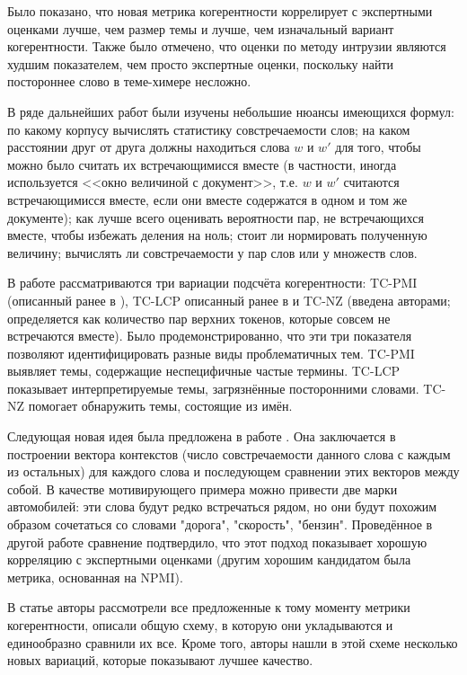 Было показано, что новая метрика когерентности коррелирует с экспертными оценками лучше, чем размер темы и лучше, чем изначальный вариант когерентности. Также было отмечено, что оценки по методу интрузии являются худшим показателем, чем просто экспертные оценки, поскольку найти постороннее слово в теме-химере несложно.

В ряде дальнейших работ были изучены небольшие нюансы имеющихся формул: по какому корпусу вычислять статистику совстречаемости слов; на каком расстоянии друг от друга должны находиться слова $w$ и $w'$ для того, чтобы можно было считать их встречающимисся вместе (в частности, иногда используется <<окно величиной с документ>>, т.е. $w$ и $w'$ считаются встречающимисся вместе, если они вместе содержатся в одном и том же документе); как лучше всего оценивать вероятности пар, не встречающихся вместе, чтобы избежать деления на ноль; стоит ли нормировать полученную величину; вычислять ли совстречаемости у пар слов или у множеств слов.

В работе \cite{boydcare} рассматриваются три вариации подсчёта когерентности: TC-PMI (описанный ранее в \cite{newman2010automatic}), TC-LCP описанный ранее в \cite{mimno} и TC-NZ (введена авторами; определяется как количество пар верхних токенов, которые совсем не встречаются вместе). Было продемонстрированно, что эти три показателя позволяют идентифицировать разные виды проблематичных тем. TC-PMI выявляет темы, содержащие неспецифичные частые термины. TC-LCP показывает интерпретируемые темы, загрязнённые посторонними словами. TC-NZ помогает обнаружить темы, состоящие из имён.

Следующая новая идея была предложена в работе \cite{aletras2013evaluating}. Она заключается в построении вектора контекстов (число совстречаемости данного слова с каждым из остальных) для каждого слова и последующем сравнении этих векторов между собой. В качестве мотивирующего примера можно привести две марки автомобилей: эти слова будут редко встречаться рядом, но они будут похожим образом сочетаться со словами "дорога", "скорость", "бензин". Проведённое в другой работе \cite{mrtl} сравнение подтвердило, что этот подход показывает хорошую корреляцию с экспертными оценками (другим хорошим кандидатом была метрика, основанная на NPMI).

В статье \cite{roder2015exploring} авторы рассмотрели все предложенные к тому моменту метрики когерентности, описали общую схему, в которую они укладываются и единообразно сравнили их все. Кроме того, авторы нашли в этой схеме несколько новых вариаций, которые показывают лучшее качество. 

